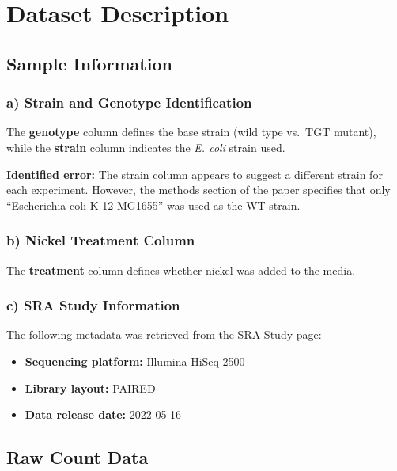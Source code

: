 \documentclass[
  11pt,
]{article}
\providecommand{\tightlist}{%
  \setlength{\itemsep}{0pt}\setlength{\parskip}{0pt}}
\begin{document}
\newpage

\section{Dataset Description}\label{dataset-description}

\subsection{Sample Information}\label{sample-information}

\subsubsection{a) Strain and Genotype
Identification}\label{a-strain-and-genotype-identification}

The \textbf{genotype} column defines the base strain (wild type vs.~TGT
mutant), while the \textbf{strain} column indicates the \emph{E. coli}
strain used.

\textbf{Identified error:} The strain column appears to suggest a
different strain for each experiment. However, the methods section of
the paper specifies that only ``Escherichia coli K-12 MG1655'' was used
as the WT strain.

\subsubsection{b) Nickel Treatment
Column}\label{b-nickel-treatment-column}

The \textbf{treatment} column defines whether nickel was added to the
media.

\subsubsection{c) SRA Study Information}\label{c-sra-study-information}

The following metadata was retrieved from the SRA Study page:

\begin{itemize}
\tightlist
\item
  \textbf{Sequencing platform:} Illumina HiSeq 2500
\item
  \textbf{Library layout:} PAIRED
\item
  \textbf{Data release date:} 2022-05-16
\end{itemize}

\subsection{Raw Count Data}\label{raw-count-data}
\end{document}
